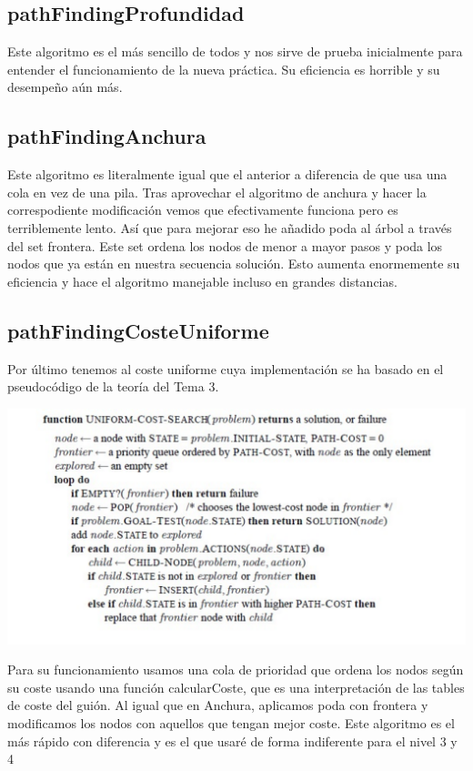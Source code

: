 \documentclass[12pt, spanish]{article}
\begin{document}
\subsection{pathFindingProfundidad}
Este algoritmo es el más sencillo de todos y nos sirve de prueba inicialmente para entender el funcionamiento de la nueva práctica. Su eficiencia es horrible y su desempeño aún más.

\subsection{pathFindingAnchura}
Este algoritmo es literalmente igual que el anterior a diferencia de que usa una cola en vez de una pila. Tras aprovechar el algoritmo de anchura y hacer la correspodiente modificación vemos que efectivamente funciona pero es terriblemente lento. Así que para mejorar eso he añadido poda al árbol a través del set frontera. Este set ordena los nodos de menor a mayor pasos y poda los nodos que ya están en nuestra secuencia solución. Esto aumenta enormemente su eficiencia y hace el algoritmo manejable incluso en grandes distancias.

\subsection{pathFindingCosteUniforme}
Por último tenemos al coste uniforme cuya implementación se ha basado en el pseudocódigo de la teoría del Tema 3.

\includegraphics[scale = 0.50]{costeUniforme.png}

Para su funcionamiento usamos una cola de prioridad que ordena los nodos según su coste usando una función calcularCoste, que es una interpretación de las tables de coste del guión. Al igual que en Anchura, aplicamos poda con frontera y modificamos los nodos con aquellos que tengan mejor coste. Este algoritmo es el más rápido con diferencia y es el que usaré de forma indiferente para el nivel 3 y 4
\end{document}
